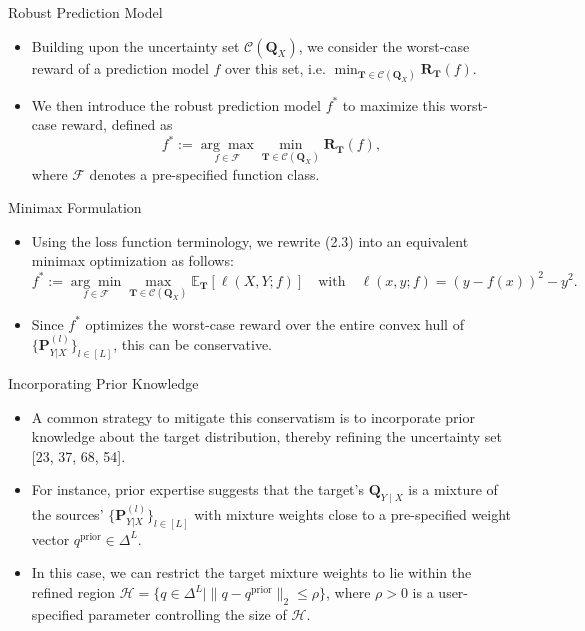 \documentclass{beamer}
\begin{document}
\begin{frame}{Robust Prediction Model}
    \begin{itemize}
        \item Building upon the uncertainty set $\mathcal{C}(\mathbf{Q}_X)$, we consider the worst-case reward of a prediction model $f$ over this set, i.e. $\min_{\mathbf{T} \in \mathcal{C}(\mathbf{Q}_X)} \mathbf{R}_{\mathbf{T}}(f)$.
        \item We then introduce the robust prediction model $f^{*}$ to maximize this worst-case reward, defined as
        \[
        f^{*} := \underset{f \in \mathcal{F}}{\arg \max} \underset{\mathbf{T} \in \mathcal{C}(\mathbf{Q}_{X})}{\min} \mathbf{R}_{\mathbf{T}}(f), 
        \]
        where $\mathcal{F}$ denotes a pre-specified function class.
    \end{itemize}
\end{frame}

\begin{frame}{Minimax Formulation}
    \begin{itemize}
        \item Using the loss function terminology, we rewrite (2.3) into an equivalent minimax optimization as follows:
        \[
        f^{*} := \underset{f \in \mathcal{F}}{\arg \min} \underset{\mathbf{T} \in \mathcal{C}(\mathbf{Q}_{X})}{\max} \mathbb{E}_{\mathbf{T}}[ \ell(X, Y; f) ] \quad \text{with} \quad \ell(x, y; f) = (y - f(x))^{2} - y^{2}.
        \]
        \item Since $f^{*}$ optimizes the worst-case reward over the entire convex hull of $\{ \mathbf{P}_{Y|X}^{(l)} \}_{l \in [L]}$, this can be conservative.
    \end{itemize}
\end{frame}

\begin{frame}{Incorporating Prior Knowledge}
    \begin{itemize}
        \item A common strategy to mitigate this conservatism is to incorporate prior knowledge about the target distribution, thereby refining the uncertainty set [23, 37, 68, 54].
        \item For instance, prior expertise suggests that the target's $\mathbf{Q}_{Y \mid X}$ is a mixture of the sources' $\{ \mathbf{P}_{Y|X}^{(l)} \}_{l \in [L]}$ with mixture weights close to a pre-specified weight vector $q^{\mathrm{prior}} \in \Delta^{L}$.
        \item In this case, we can restrict the target mixture weights to lie within the refined region $\mathcal{H} = \{ q \in \Delta^{L} \mid \| q - q^{\mathrm{prior}} \lVert_{2} \leq \rho \}$, where $\rho > 0$ is a user-specified parameter controlling the size of $\mathcal{H}$.
    \end{itemize}
\end{frame}
\end{document}
